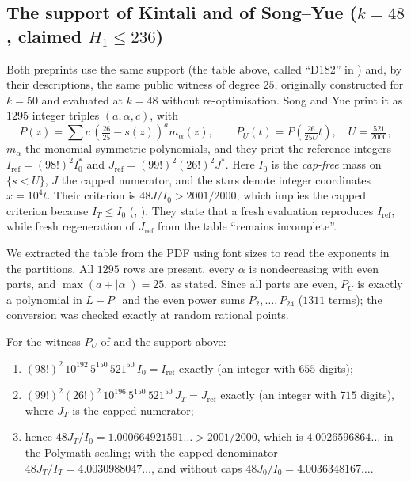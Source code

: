 \subsection*{The support of Kintali and of Song--Yue ($k=48$, claimed $H_1\le236$)}
Both preprints use the same support (the table above, called ``D182'' in
\cite{Kin26}) and, by their descriptions, the same public witness of degree
$25$, originally constructed for $k=50$ and evaluated at $k=48$ without
re-optimisation. Song and Yue print it as $1295$ integer triples
$(a,\alpha,c)$, with
\[
P(z)=\sum c\,\left(\tfrac{26}{25}-s(z)\right)^a m_\alpha(z),\qquad
P_U(t)=P\!\left(\tfrac{26}{25U}t\right),\quad U=\tfrac{521}{2000},
\]
$m_\alpha$ the monomial symmetric polynomials, and they print the reference
integers $I_{\mathrm{ref}}=(98!)^2I_0^\ast$ and
$J_{\mathrm{ref}}=(99!)^2(26!)^2J^\ast$. Here $I_0$ is the \emph{cap-free} mass
on $\{s<U\}$, $J$ the capped numerator, and the stars denote integer
coordinates $x=10^4t$. Their criterion is $48J/I_0>2001/2000$, which implies
the capped criterion because $I_T\le I_0$ (,
\cite[\S4.12, App.~A, App.~C]{SY26}). They state that a fresh evaluation
reproduces $I_{\mathrm{ref}}$, while fresh regeneration of $J_{\mathrm{ref}}$
from the table ``remains incomplete''.

We extracted the table from the PDF using font sizes to read the exponents in
the partitions. All $1295$ rows are present, every $\alpha$ is nondecreasing
with even parts, and $\max(a+|\alpha|)=25$, as stated. Since all parts are
even, $P_U$ is exactly a polynomial in $L-P_1$ and the even power sums
$P_2,\dots,P_{24}$ ($1311$ terms); the conversion was checked exactly at random
rational points.

\begin{theorem}\label{thm:sy}
For the witness $P_U$ of \cite{SY26} and the support above:
\begin{enumerate}
\item $(98!)^2\,10^{192}\,5^{150}\,521^{50}\,I_0=I_{\mathrm{ref}}$ exactly
(an integer with $655$ digits);
\item $(99!)^2(26!)^2\,10^{196}\,5^{150}\,521^{50}\,J_T=J_{\mathrm{ref}}$
exactly (an integer with $715$ digits), where $J_T$ is the capped numerator;
\item hence $48J_T/I_0=1.000664921591\ldots>2001/2000$, which is
$4.0026596864\ldots$ in the Polymath scaling; with the capped denominator
$48J_T/I_T=4.0030988047\ldots$, and without caps $48J_0/I_0=4.0036348167\ldots$.
\end{enumerate}
\end{theorem}


